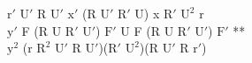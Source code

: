 $\text{r}'$ $\text{U}'$ R $\text{U}'$ $\text{x}'$ (R $\text{U}'$ $\text{R}'$ U) x $\text{R}'$ $\text{U}^2$ r\\
$\text{y}'$ F (R U $\text{R}'$ $\text{U}'$) $\text{F}'$ U F (R U $\text{R}'$ $\text{U}'$) $\text{F}'$ **\\
$\text{y}^2$ (r $\text{R}^2$ $\text{U}'$ R $\text{U}'$)($\text{R}'$ $\text{U}^2$)(R $\text{U}'$ R $\text{r}'$)\\
